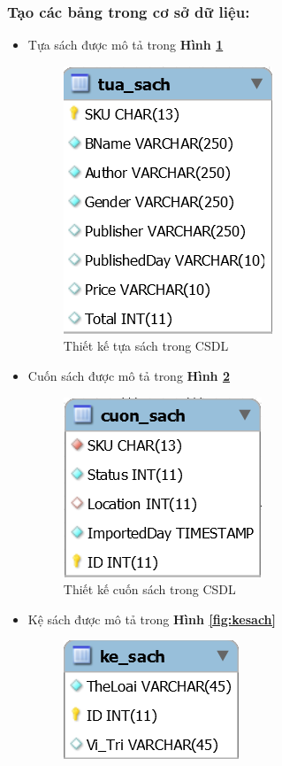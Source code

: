 \documentclass[12pt]{report}
\begin{document}
			\subsubsection*{Tạo các bảng trong cơ sở dữ liệu:}
				\begin{itemize}
					\item{Tựa sách được mô tả trong \textbf{Hình \ref{fig:tuasach}}}
					\begin{figure}[H]
						\centering
						\includegraphics[scale=1]{images/tuasach.png}
						\caption{Thiết kế tựa sách trong CSDL}
						\label{fig:tuasach}
					\end{figure}
					\item{Cuốn sách được mô tả trong \textbf{Hình \ref{fig:cuonsach}}}
					\begin{figure}[H]
						\centering
						\includegraphics[scale=1]{images/cuonsach.png}
						\caption{Thiết kế cuốn sách trong CSDL}
						\label{fig:cuonsach}
					\end{figure}
					\item{Kệ sách được mô tả trong \textbf{Hình \ref{fig:kesach}}}
					\begin{figure}[H]
						\centering
						\includegraphics[scale=1]{images/kesach.png}

\end{figure}
\end{itemize}
\end{document}
